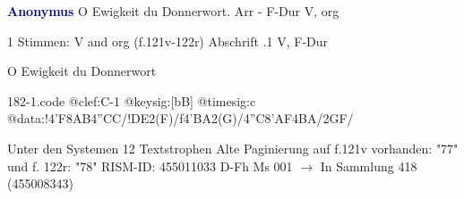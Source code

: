 \documentclass[twocolumn]{book}
\begin{document}
\newline \par \vspace{7pt} \textcolor{darkblue}{\textbf{Anonymus  }}
\newline O Ewigkeit du Donnerwort. Arr - F-Dur
\newline V, org
\newline \begin{itshape}\end{itshape} 
\newline \textcolor{darkblue}{}  1 Stimmen: V and org  (f.121v-122r)
\newline Abschrift
.1  V, F-Dur
\newline \begin{footnotesize} O Ewigkeit du Donnerwort \end{footnotesize}  
\begin{filecontents*}{182-1.code}
@clef:C-1
@keysig:[bB]
@timesig:c
@data:!4'F8AB4''CC/!DE2(F)/f4'BA2(G)/4''C8'AF4BA/2GF/
\end{filecontents*}
\newline
%
\newline Unter den Systemen 12 Textstrophen
\newline Alte Paginierung auf f.121v vorhanden: "77" und f. 122r: "78"
\newline RISM-ID: 455011033
\newline D-Fh  Ms 001
\newline $\rightarrow$ In Sammlung 418 (455008343)
      
\end{document}

